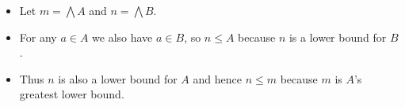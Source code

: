 \begin{itemize}
    \item  Let $m = \bigwedge A$ and $n = \bigwedge B$.
    \item For any $a \in A$ we also have $a \in B$, so $n \leq A$ because $n$ is a lower bound for $B$.
    \item Thus $n$ is also a lower bound for $A$ and hence $n \leq m$ because $m$ is $A$'s greatest lower bound.
  \end{itemize}